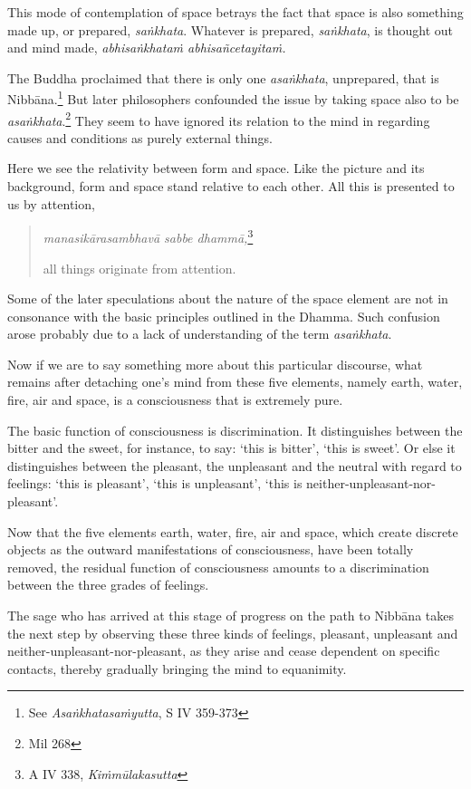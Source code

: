 This mode of contemplation of space betrays the fact that space is also something made up, or prepared, \emph{saṅkhata}. Whatever is prepared, \emph{saṅkhata}, is thought out and mind made, \emph{abhisaṅkhataṁ abhisañcetayitaṁ.}

The Buddha proclaimed that there is only one \emph{asaṅkhata}, unprepared, that is Nibbāna.\footnote{See \emph{Asaṅkhatasaṁyutta}, S IV 359-373} But later philosophers confounded the issue by taking space also to be \emph{asaṅkhata}.\footnote{Mil 268} They seem to have ignored its relation to the mind in regarding causes and conditions as purely external things.

Here we see the relativity between form and space. Like the picture and its background, form and space stand relative to each other. All this is presented to us by attention,

\begin{quote}
\emph{manasikārasambhavā sabbe dhammā,}\footnote{A IV 338, \emph{Kiṁmūlakasutta}}

all things originate from attention.
\end{quote}

Some of the later speculations about the nature of the space element are not in consonance with the basic principles outlined in the Dhamma. Such confusion arose probably due to a lack of understanding of the term \emph{asaṅkhata}.

Now if we are to say something more about this particular discourse, what remains after detaching one's mind from these five elements, namely earth, water, fire, air and space, is a consciousness that is extremely pure.

The basic function of consciousness is discrimination. It distinguishes between the bitter and the sweet, for instance, to say: `this is bitter', `this is sweet'. Or else it distinguishes between the pleasant, the unpleasant and the neutral with regard to feelings: `this is pleasant', `this is unpleasant', `this is neither-unpleasant-nor-pleasant'.

Now that the five elements earth, water, fire, air and space, which create discrete objects as the outward manifestations of consciousness, have been totally removed, the residual function of consciousness amounts to a discrimination between the three grades of feelings.

The sage who has arrived at this stage of progress on the path to Nibbāna takes the next step by observing these three kinds of feelings, pleasant, unpleasant and neither-unpleasant-nor-pleasant, as they arise and cease dependent on specific contacts, thereby gradually bringing the mind to equanimity.


